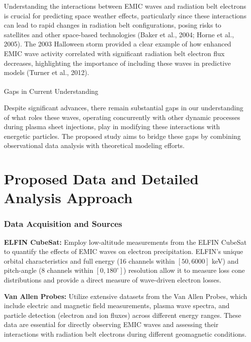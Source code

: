 \documentclass[
  letterpaper,
  DIV=11,
  numbers=noendperiod]{scrartcl}
\makeatletter
\let\oldparagraph\paragraph
\renewcommand{\paragraph}{
    \@ifstar
      \xxxParagraphStar
      \xxxParagraphNoStar
  }
\newcommand{\xxxParagraphStar}[1]{\oldparagraph*{#1}\mbox{}}
\newcommand{\xxxParagraphNoStar}[1]{\oldparagraph{#1}\mbox{}}
\makeatother
\begin{document}
Understanding the interactions between EMIC waves and radiation belt electrons is crucial for predicting space weather effects, particularly since these interactions can lead to rapid changes in radiation belt configurations, posing risks to satellites and other space-based technologies (Baker et al., 2004; Horne et al., 2005). The 2003 Halloween storm provided a clear example of how enhanced EMIC wave activity correlated with significant radiation belt electron flux decreases, highlighting the importance of including these waves in predictive models (Turner et al., 2012).

\paragraph{Gaps in Current Understanding}\label{gaps-in-current-understanding}

Despite significant advances, there remain substantial gaps in our understanding of what roles these waves, operating concurrently with other dynamic processes during plasma sheet injections, play in modifying these interactions with energetic particles. The proposed study aims to bridge these gaps by combining observational data analysis with theoretical modeling efforts.

\section{Proposed Data and Detailed Analysis Approach}\label{proposed-data-and-detailed-analysis-approach}

\subsubsection{Data Acquisition and Sources}\label{data-acquisition-and-sources}

\textbf{ELFIN CubeSat:} Employ low-altitude measurements from the ELFIN CubeSat to quantify the effects of EMIC waves on electron precipitation. ELFIN's unique orbital characteristics and full energy (16 channels within \([50,6000]\) keV) and pitch-angle (8 channels within \([0,180^\circ]\)) resolution allow it to measure loss cone distributions and provide a direct measure of wave-driven electron losses.

\textbf{Van Allen Probes:} Utilize extensive datasets from the Van Allen Probes, which include electric and magnetic field measurements, plasma wave spectra, and particle detection (electron and ion fluxes) across different energy ranges. These data are essential for directly observing EMIC waves and assessing their interactions with radiation belt electrons during different geomagnetic conditions.
\end{document}
